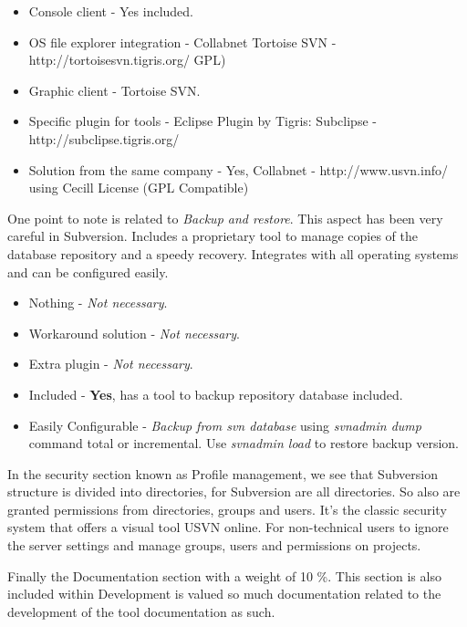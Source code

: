 \documentclass[11pt]{scrartcl}
\begin{document}
\begin{itemize}
    \item Console client - Yes included.
    \item OS file explorer integration - Collabnet Tortoise SVN - http://tortoisesvn.tigris.org/ GPL)
    \item Graphic client - Tortoise SVN.
    \item Specific plugin for tools - Eclipse Plugin by Tigris: Subclipse - http://subclipse.tigris.org/
    \item Solution from the same company - Yes, Collabnet - http://www.usvn.info/ using Cecill License (GPL Compatible)
\end{itemize}

\par One point to note is related to \emph{Backup and restore}. This aspect has been very careful in Subversion. Includes a proprietary tool to manage copies of the database repository and a speedy recovery. Integrates with all operating systems and can be configured easily.

\begin{itemize}
    \item Nothing - \emph{Not necessary}.
    \item Workaround solution - \emph{Not necessary}.
    \item Extra plugin - \emph{Not necessary}.
    \item Included - \textbf{Yes}, has a tool to backup repository database included.
    \item Easily Configurable - \emph{Backup from svn database} using \emph{svnadmin dump} command total or incremental. Use \emph{svnadmin load} to restore backup version.
\end{itemize}

\par In the security section known as Profile management, we see that Subversion structure is divided into directories, for Subversion are all directories. So also are granted permissions from directories, groups and users. It's the classic security system that offers a visual tool USVN online. For non-technical users to ignore the server settings and manage groups, users and permissions on projects.

\par Finally the Documentation section with a weight of 10 \%. This section is also included within Development is valued so much documentation related to the development of the tool documentation as such.
\end{document}
